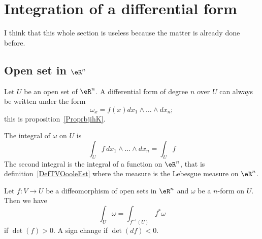 \section{Integration of a differential form}

I think that this whole section is useless because the matter is already done before.

\subsection{Open set in \( \eR^n\)}

Let \( U\) be an open set of \( \eR^n\). A differential form of degree \( n\) over \( U\) can always be written under the form
\begin{equation}
	\omega_x=f(x)dx_1\wedge\ldots\wedge dx_n;
\end{equation}
this is proposition~\ref{ProprbjihK}.

\begin{definition}      \label{DEFooEYRFooRQTmRF}
	The integral of \( \omega\) on \( U\) is
	\begin{equation}
		\int_{U}f\,dx_1\wedge\ldots\wedge dx_n=\int_Uf
	\end{equation}
	The second integral is the integral of a function on \( \eR^n\), that is definition~\ref{DefTVOooleEst} where the measure is the Lebesgue measure on \( \eR^n\).
\end{definition}

\begin{lemma}       \label{LEMooNCYSooXtnCKq}
	Let \( f\colon V\to U\) be a diffeomorphism of open sets in \( \eR^n\) and \( \omega\) be a \( n\)-form on \( U\). Then we have
	\begin{equation}
		\int_U\omega=\int_{f^{-1}(U)}f^*\omega
	\end{equation}
	if \( \det(f)>0\). A sign change if \( \det(df)<0\).
\end{lemma}

